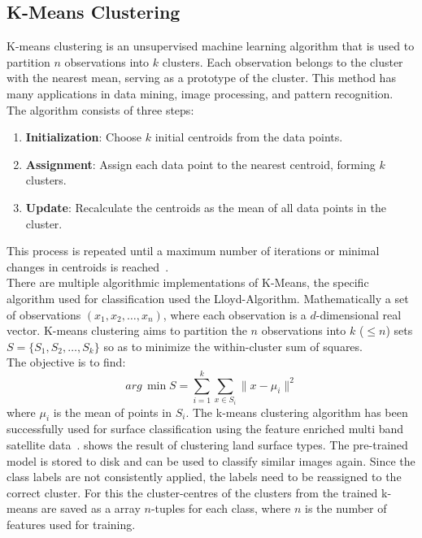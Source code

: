 \documentclass[12pt,a4paper, english,twoside]{scrartcl}
\begin{document}
%
\newpage
  \subsection{K-Means Clustering}\label{sec:kmeans}
    K-means clustering is an unsupervised machine learning algorithm that is used to partition $n$ observations into $k$ clusters. 
    Each observation belongs to the cluster with the nearest mean, serving as a prototype of the cluster. 
    This method has many applications in data mining, image processing, and pattern recognition.\\
    The algorithm consists of three steps:
    \begin{enumerate}
        \item \textbf{Initialization}: Choose $k$ initial centroids from the data points.
        \item \textbf{Assignment}: Assign each data point to the nearest centroid, forming $k$ clusters.
        \item \textbf{Update}: Recalculate the centroids as the mean of all data points in the cluster. 
    \end{enumerate}
    This process is repeated until a maximum number of iterations or minimal changes in centroids is reached~\autocite{Sinaga2020}.\\ 
    There are multiple algorithmic implementations of K-Means, the specific algorithm used for classification used the Lloyd-Algorithm.
    Mathematically a set of observations $(x_1, x_2, \ldots, x_n)$, where each observation is a $d$-dimensional real vector.
    K-means clustering aims to partition the $n$ observations into $k$ ($\leq n$) sets $S = \{S_1, S_2, \ldots, S_k\}$ so as to minimize the within-cluster sum of squares. \\
    The objective is to find:
    \begin{equation}
        arg\,\min{S} = \sum_{i=1}^{k} \sum_{x \in S_i} \| x - \mu_i \|^2
    \end{equation}
    where $\mu_i$ is the mean of points in $S_i$.
    The k-means clustering algorithm has been successfully used for surface classification using the feature enriched multi band satellite data~\autocite[e.g.]{Burrough2000}.
     shows the result of clustering land surface types. 
    The pre-trained model is stored to disk and can be used to classify similar images again. 
    Since the class labels are not consistently applied, the labels need to be reassigned to the correct cluster.
    For this the cluster-centres of the clusters from the trained k-means are saved as a array $n$-tuples for each class, where $n$ is the number of features used for training.
    \newpage
\end{document}
